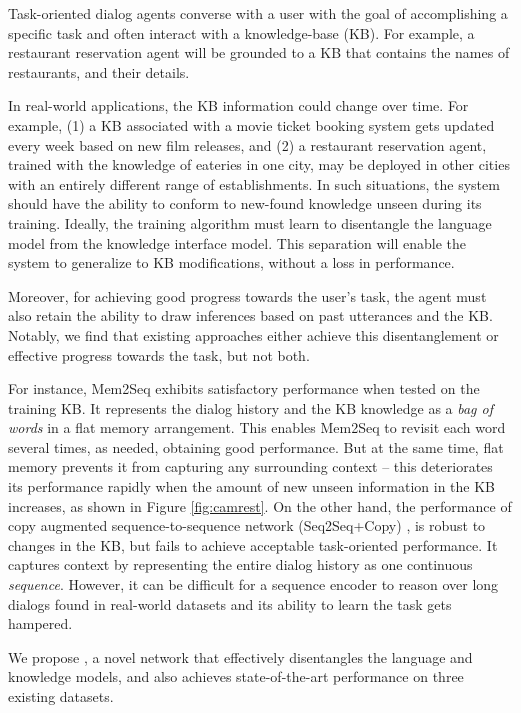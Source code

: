 Task-oriented dialog agents converse with a user with the goal of accomplishing a specific task and often interact with a knowledge-base (KB). For example, a restaurant reservation agent \cite{hen2014word} will be grounded  to a KB that contains the names of restaurants, and their details.  

In real-world applications, the KB information could change over time. For example, (1) a KB associated with a movie ticket booking system gets updated every week based on new film releases, and (2) a restaurant reservation agent, trained with the knowledge of eateries in one city, may be deployed in other cities with an entirely different range of establishments. In such situations, the system should have the ability to conform to new-found knowledge unseen during its training. Ideally, the training algorithm must learn to disentangle the language model from the knowledge interface model. This separation will enable the system to generalize to KB modifications, without a loss in performance.  

Moreover, for achieving good progress towards the user's task, the agent must also retain the ability to  draw inferences based on past utterances and the KB. Notably, we find that existing approaches either achieve this disentanglement or effective progress towards the task, but not both.  

For instance, Mem2Seq \cite{mem2seq} exhibits satisfactory performance when tested on the training KB. It represents the dialog history and the KB knowledge as a \emph{bag of words} in a flat memory arrangement. This enables Mem2Seq to revisit each word several times, as needed, obtaining good performance. But at the same time, flat memory prevents it from capturing any surrounding context -- this deteriorates its performance rapidly when the amount of new unseen information in the KB increases, as shown in Figure \ref{fig:camrest}. On the other hand, the performance of copy augmented sequence-to-sequence network (Seq2Seq+Copy) \cite{eric2017copy}, is robust to changes in the KB, but fails to achieve acceptable task-oriented performance. It captures context by representing the entire dialog history as one continuous \emph{sequence}.
However, it can be difficult for a sequence encoder to reason over long dialogs found in real-world datasets and its ability to learn the task gets hampered.  

We propose \sys, a novel network that effectively disentangles the language and knowledge models, and also achieves state-of-the-art performance on three existing datasets.  

